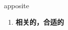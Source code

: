 
\begin{frame}
{\huge apposite}
\begin{center}
\begin{enumerate}\Large
  \item \textbf{相关的，合适的}
\end{enumerate}
\end{center}
\end{frame}

